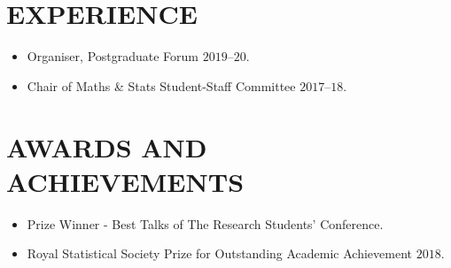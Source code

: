 \documentclass[11pt,a4paper,roman]{moderncv}        %
\begin{document}
\section{EXPERIENCE}
\begin{minipage}{\maincolumnwidth}%
	\small{
    	\begin{itemize}
	  \item {Organiser, Postgraduate Forum $2019$--$20$. \vspace{0.1cm}}
          \item {Chair of Maths \& Stats Student-Staff Committee $2017$--$18$. \vspace{0.1cm}}
		\end{itemize}}
\end{minipage}%
      
\section{AWARDS AND ACHIEVEMENTS}
\begin{minipage}{\maincolumnwidth}%
	\small{
    	\begin{itemize}
	  \item {Prize Winner - Best Talks of The Research Students' Conference. \vspace{0.1cm}}
          \item {Royal Statistical Society Prize for Outstanding Academic Achievement $2018$.  \vspace{0.1cm}}
	
	\end{itemize}
	}
\end{minipage}%
      

\nocite{*}



\end{document}
